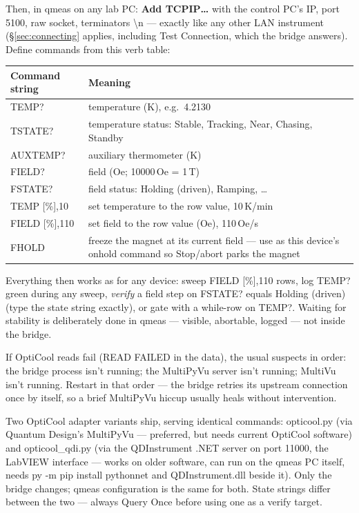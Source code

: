 \documentclass[11pt,a4paper]{article}
\newcommand{\code}[1]{{\ttfamily\color{qcode}#1}}
\begin{document}
Then, in qmeas on any lab PC: \textbf{Add TCPIP\ldots} with the control PC's
IP, port \code{5100}, raw socket, terminators \code{\textbackslash n} ---
exactly like any other LAN instrument (\S\ref{sec:connecting} applies,
including Test Connection, which the bridge answers). Define commands from
this verb table:

\begin{center}\small
\begin{tabular}{@{}p{5.2cm}p{8.6cm}@{}}
\toprule
\textbf{Command string} & \textbf{Meaning} \\
\midrule
\code{TEMP?} & temperature (K), e.g.\ \code{4.2130} \\
\code{TSTATE?} & temperature status: \code{Stable}, \code{Tracking},
  \code{Near}, \code{Chasing}, \code{Standby} \\
\code{AUXTEMP?} & auxiliary thermometer (K) \\
\code{FIELD?} & field (Oe; 10000\,Oe = 1\,T) \\
\code{FSTATE?} & field status: \code{Holding (driven)}, \code{Ramping}, \ldots \\
\code{TEMP [\%],10} & set temperature to the row value, 10\,K/min \\
\code{FIELD [\%],110} & set field to the row value (Oe), 110\,Oe/s \\
\code{FHOLD} & freeze the magnet at its current field --- use as this
  device's \code{onhold} command so Stop/abort parks the magnet \\
\bottomrule
\end{tabular}
\end{center}

Everything then works as for any device: sweep \code{FIELD [\%],110} rows,
log \code{TEMP?} green during any sweep, \emph{verify} a field step on
\code{FSTATE?} equals \code{Holding (driven)} (type the state string
exactly), or gate with a while-row on \code{TEMP?}. Waiting for stability is
deliberately done in qmeas --- visible, abortable, logged --- not inside the
bridge.

\begin{tip}
If OptiCool reads fail (\code{READ FAILED} in the data), the usual suspects
in order: the bridge process isn't running; the MultiPyVu server isn't
running; MultiVu isn't running. Restart in that order --- the bridge retries
its upstream connection once by itself, so a brief MultiPyVu hiccup usually
heals without intervention.
\end{tip}

\begin{note}
Two OptiCool adapter variants ship, serving identical commands:
\code{opticool.py} (via Quantum Design's MultiPyVu --- preferred, but needs
current OptiCool software) and \code{opticool\_qdi.py} (via the QDInstrument
.NET server on port 11000, the LabVIEW interface --- works on older software,
can run on the qmeas PC itself, needs \code{py -m pip install pythonnet} and
\code{QDInstrument.dll} beside it). Only the bridge changes; qmeas
configuration is the same for both. State strings differ between the two ---
always Query Once before using one as a verify target.
\end{note}
\end{document}
